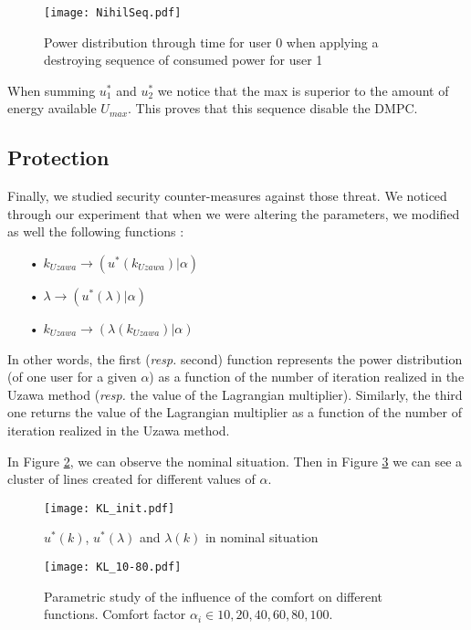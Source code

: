 \documentclass[conference, peerreview]{IEEEtran}
\begin{document}
\begin{figure}[H]
\centering
\texttt{[image: NihilSeq.pdf]}
\caption{Power distribution through time for user 0 when applying a destroying sequence of consumed power for user 1}
\label{Nihil_2}
\end{figure}

When summing $u^*_1$ and $u^*_2$ we notice that the max is superior to the amount of energy available $U_{max}$. This proves that this sequence disable the DMPC. 

\subsection{Protection}
Finally, we studied security counter-measures against those threat. We noticed through our experiment that when we were altering the parameters, we modified as well the following functions :
\begin{itemize}
\item[•] $k_{Uzawa} \rightarrow (u^*(k_{Uzawa}) | \alpha)$
\item[•] $\lambda \rightarrow (u^*(\lambda) | \alpha)$
\item[•] $k_{Uzawa} \rightarrow (\lambda (k_{Uzawa}) | \alpha)$
\end{itemize} 
In other words, the first (\textit{resp.} second) function represents the power distribution (of one user for a given $\alpha$) as a function of the number of iteration realized in the Uzawa method (\textit{resp.} the value of the Lagrangian multiplier). Similarly, the third one returns the value of the Lagrangian multiplier as a function of the number of iteration realized in the Uzawa method. 

In Figure \ref{CM_1}, we can observe the nominal situation. Then in Figure \ref{CM_2} we can see a cluster of lines created for different values of $\alpha$.

\begin{figure}[!t]
\centering
\texttt{[image: KL\_init.pdf]}
\caption{$u^*(k)$, $u^*(\lambda)$ and $\lambda(k)$ in nominal situation}
\label{CM_1}
\end{figure}

\begin{figure}[!t]
\centering
\texttt{[image: KL\_10-80.pdf]}
\caption{Parametric study of the influence of the comfort on different functions. Comfort factor $\alpha_i \in {10, 20, 40, 60, 80, 100}$.}
\label{CM_2}
\end{figure}
\end{document}
